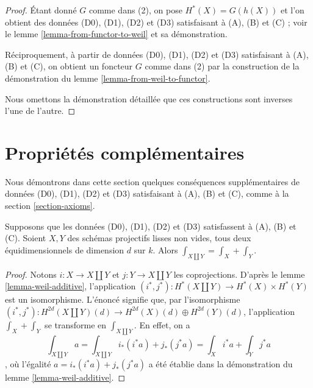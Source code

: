 \begin{proof}
Étant donné $G$ comme dans (2), on pose $H^*(X) = G(h(X))$ et l'on obtient des données
(D0), (D1), (D2) et (D3) satisfaisant à (A), (B) et (C) ;
voir le lemme \ref{lemma-from-functor-to-weil} et sa démonstration.

\medskip\noindent
Réciproquement, à partir de données (D0), (D1), (D2) et (D3)
satisfaisant à (A), (B) et (C), on obtient un foncteur $G$ comme dans (2)
par la construction de la démonstration du lemme \ref{lemma-from-weil-to-functor}.

\medskip\noindent
Nous omettons la démonstration détaillée que ces constructions
sont inverses l'une de l'autre.
\end{proof}











\section{Propriétés complémentaires}
\label{section-further}

\noindent
Nous démontrons dans cette section quelques conséquences supplémentaires
de données (D0), (D1), (D2) et (D3) satisfaisant à (A), (B) et (C),
comme à la section \ref{section-axioms}.

\begin{lemma}
\label{lemma-trace-disjoint-union}
Supposons que les données (D0), (D1), (D2) et (D3) satisfassent à (A), (B) et (C).
Soient $X, Y$ des schémas projectifs lisses non vides, tous deux équidimensionnels
de dimension $d$ sur $k$. Alors $\int_{X \amalg Y} = \int_X + \int_Y$.
\end{lemma}

\begin{proof}
Notons $i : X \to X \amalg Y$ et $j : Y \to X \amalg Y$ les coprojections.
D'après le lemme \ref{lemma-weil-additive}, l'application
$(i^*, j^*) : H^*(X \amalg Y) \to H^*(X) \times H^*(Y)$ est un isomorphisme.
L'énoncé signifie que, par l'isomorphisme
$(i^*, j^*) : H^{2d}(X \amalg Y)(d) \to H^{2d}(X)(d) \oplus H^{2d}(Y)(d)$,
l'application $\int_X + \int_Y$ se transforme en $\int_{X \amalg Y}$.
En effet, on a
$$
\int_{X \amalg Y} a =
\int_{X \amalg Y} i_*(i^*a) + j_*(j^*a) =
\int_X i^*a + \int_Y j^*a
$$,
où l'égalité $a = i_*(i^*a) + j_*(j^*a)$ a été établie dans
la démonstration du lemme \ref{lemma-weil-additive}.
\end{proof}

